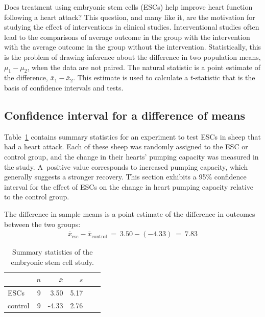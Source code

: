 Does treatment using embryonic stem cells (ESCs) help improve heart function following a heart attack?  This question, and many like it, are the motivation for studying the effect of interventions in clinical studies. Interventional studies often lead to the comparisons of average outcome in the group with the intervention with the average outcome in the group without the intervention.  Statistically, this is the problem of drawing inference about the difference in two population means, $\mu_1 - \mu_2$, when the data are not paired. The natural statistic is a point estimate of the difference, $\bar{x}_1 - \bar{x}_2$.  This estimate is used to calculate a $t$-statistic that is the basis of confidence intervals and tests.

\subsection{Confidence interval for a difference of means}


Table~\ref{summaryStatsForSheepHeartDataWhoReceivedMiceESCs} contains summary statistics for an experiment to test ESCs in sheep that had a heart attack. Each of these sheep was randomly assigned to the ESC or control group, and the change in their hearts' pumping capacity was measured in the study. A~positive value corresponds to increased pumping capacity, which generally suggests a stronger recovery. This section exhibits a 95\% confidence interval for the effect of ESCs on the change in heart pumping capacity relative to the control group.

The difference in sample means is a point estimate of the difference in outcomes between the two groups:
\begin{eqnarray*}
\bar{x}_{\text{esc}} - \bar{x}_{\text{control}}\ =\ 3.50 - (-4.33)\ =\ 7.83
\end{eqnarray*}

\begin{table}[h]
\centering
\begin{tabular}{l rrrrr}
\hline
\hspace{10mm}	& $n$	& $\bar{x}$	& $s$  	 \\
\hline
ESCs		& 9		& 3.50		& 5.17  	\\
control		& 9		& -4.33		& 2.76  	 \\
\hline
\end{tabular}
\caption{Summary statistics of the embryonic stem cell study.}
\label{summaryStatsForSheepHeartDataWhoReceivedMiceESCs}
\end{table}

